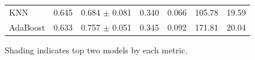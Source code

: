 \begin{table}[h]
{\begin{tabular}{llcllll}
KNN               & 0.645                                     & 0.684 $\pm$ 0.081                                     & 0.340                                     & 0.066                                     & \cellcolor{gray!45}105.78 & 19.59                                     \\
AdaBoost          & 0.633                                     & 0.757 $\pm$ 0.051                                     & 0.345                                     & 0.092                                     & 171.81                                     & 20.04                                     \\ \hline
\end{tabular}
}\footnotesize{ Shading indicates top two models by each metric.}
\label{tab:regression_log}
\end{table}


